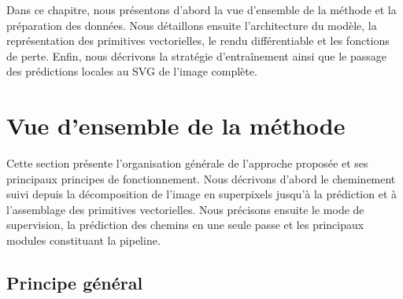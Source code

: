 \documentclass[12pt, a4paper, oneside]{report}
\begin{document}
Dans ce chapitre, nous présentons d'abord la vue d'ensemble de la méthode et la préparation des données. Nous détaillons ensuite l'architecture du modèle, la représentation des primitives vectorielles, le rendu différentiable et les fonctions de perte. Enfin, nous décrivons la stratégie d'entraînement ainsi que le passage des prédictions locales au SVG de l'image complète.

\section{Vue d'ensemble de la méthode}
\label{sec:vue_ensemble_approche}

Cette section présente l'organisation générale de l'approche proposée et ses principaux principes de fonctionnement. Nous décrivons d'abord le cheminement suivi depuis la décomposition de l'image en superpixels jusqu'à la prédiction et à l'assemblage des primitives vectorielles. Nous précisons ensuite le mode de supervision, la prédiction des chemins en une seule passe et les principaux modules constituant la pipeline.

\subsection{Principe général}
\end{document}
